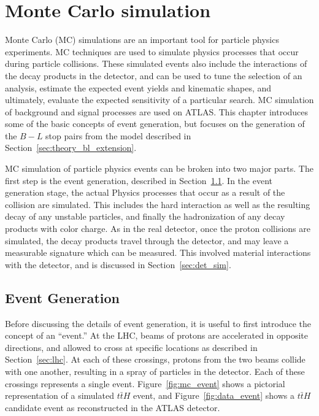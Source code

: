 \chapter[Monte Carlo simulation][Monte Carlo simulation]{Monte Carlo simulation}
\label{ch:mc}

Monte Carlo (MC) simulations are an important tool for particle physics
experiments.
MC techniques are used to simulate physics processes that occur during
particle collisions.
These simulated events also include the interactions of the decay products
in the detector, and can be used to tune the selection of an analysis,
estimate the expected event yields and kinematic shapes, and ultimately,
evaluate the expected sensitivity of a particular search.
MC simulation of background and signal processes are used on ATLAS.
This chapter introduces some of the basic concepts of event generation, but
focuses on the generation of the $B-L$ stop pairs from the model described in
Section~\ref{sec:theory_bl_extension}.

MC simulation of particle physics events can be broken into two major parts.
The first step is the event generation, described in
Section~\ref{sec:event_gen}.
In the event generation stage, the actual Physics processes that occur as a
result of the collision are simulated.
This includes the hard interaction as well as the resulting decay of any
unstable particles, and finally the hadronization of any decay products with
color charge.
As in the real detector, once the proton collisions are simulated, the decay
products travel through the detector, and may leave a measurable signature
which can be measured.
This involved material interactions with the detector, and is discussed in
Section~\ref{sec:det_sim}.

\FloatBarrier
\section{Event Generation}
\label{sec:event_gen}

Before discussing the details of event generation, it is useful to first
introduce the concept of an ``event.''
At the LHC, beams of protons are accelerated in opposite directions, and
allowed to cross at specific locations as described in Section~\ref{sec:lhc}.
At each of these crossings, protons from the two beams collide with one
another, resulting in a spray of particles in the detector.
Each of these crossings represents a single event.
Figure~\ref{fig:mc_event} shows a pictorial representation of a simulated
$t\bar{t}H$ event, and Figure~\ref{fig:data_event} shows a $t\bar{t}H$
candidate event as reconstructed in the ATLAS detector.

